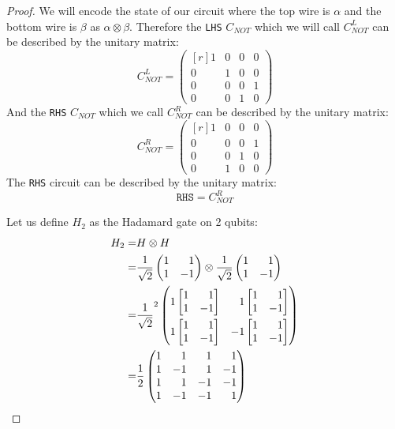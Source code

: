 \begin{proof}
We will encode the state of our circuit where the top wire is $\alpha$ and the bottom wire is $\beta$ as $\alpha \otimes \beta$.
Therefore the \texttt{LHS} $C_{NOT}$ which we will call $C_{NOT}^L$ can be described by the unitary matrix: 
\[
C_{NOT}^L = \begin{pmatrix*}[r] 1&0&0&0 \\ 0&1&0&0 \\ 0&0&0&1\\0&0&1&0 \end{pmatrix*}
\]
And the \texttt{RHS} $C_{NOT}$ which we call $C_{NOT}^R$ can be described by the unitary matrix:
\[
C_{NOT}^R = \begin{pmatrix*}[r] 1&0&0&0 \\ 0&0&0&1 \\ 0&0&1&0\\0&1&0&0 \end{pmatrix*}
\]
The \texttt{RHS} circuit can be described by the unitary matrix:
\[
    \texttt{RHS} = C_{NOT}^R   
\]

\noindent Let us define $H_2$ as the Hadamard gate on 2 qubits:
\begin{align*}
    H_2 =& H \otimes H\\
    =&\frac{1}{\sqrt{2}}\hman \otimes \frac{1}{\sqrt{2}}\hman\\
    =&\frac{1}{\sqrt{2}}^2 \tallcols{2.1}{\begin{pmatrix*}[r] 1 \normrows{\bhman} & 1\normrows{\bhman} \\ 1 \normrows{\bhman} & -1 \normrows{\bhman} \end{pmatrix*}}\\
    =&\frac{1}{2} \hmantwo
\end{align*}


\end{proof}

